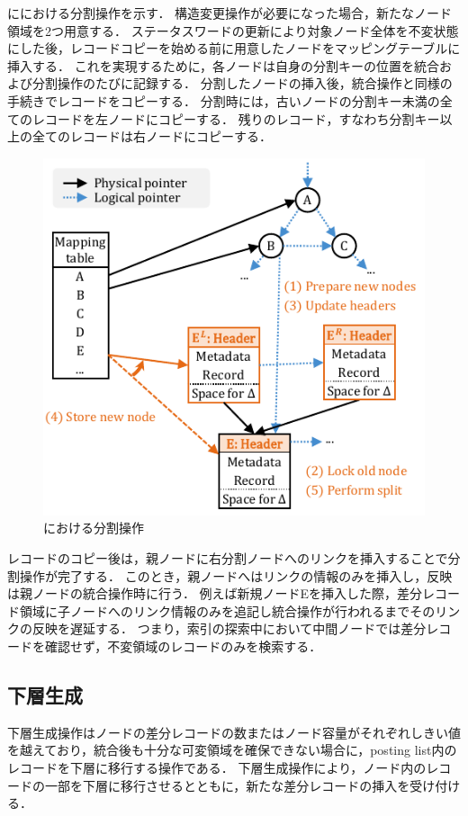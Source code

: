 \Fig{\ref{fig:bc_tree_split}}に\Bcforest{}における分割操作を示す．
構造変更操作が必要になった場合，新たなノード領域を2つ用意する．
ステータスワードの更新により対象ノード全体を不変状態にした後，レコードコピーを始める前に用意したノードをマッピングテーブルに挿入する．
これを実現するために，各ノードは自身の分割キーの位置を統合および分割操作のたびに記録する．
分割したノードの挿入後，統合操作と同様の手続きでレコードをコピーする．
分割時には，古いノードの分割キー未満の全てのレコードを左ノードにコピーする．
残りのレコード，すなわち分割キー以上の全てのレコードは右ノードにコピーする．

\begin{figure}[t]
    \centering
    \includegraphics{./figures/Bc-split.pdf}
    \caption{\Bcforest{}における分割操作}
    \label{fig:bc_tree_split}
\end{figure}

レコードのコピー後は，親ノードに右分割ノードへのリンクを挿入することで分割操作が完了する．
このとき，親ノードへはリンクの情報のみを挿入し，反映は親ノードの統合操作時に行う．
例えば新規ノードEを挿入した際，差分レコード領域に子ノードへのリンク情報のみを追記し統合操作が行われるまでそのリンクの反映を遅延する．
つまり，索引の探索中において中間ノードでは差分レコードを確認せず，不変領域のレコードのみを検索する．

\subsection{下層生成}
下層生成操作はノードの差分レコードの数またはノード容量がそれぞれしきい値を越えており，統合後も十分な可変領域を確保できない場合に，posting list内のレコードを下層に移行する操作である．
下層生成操作により，ノード内のレコードの一部を下層に移行させるとともに，新たな差分レコードの挿入を受け付ける．

